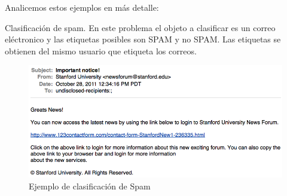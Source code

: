 \documentclass[11pt,fleqn]{book} %
\begin{document}
Analicemos estos ejemplos en más detalle:

\begin{example}
Clasificación de spam. En este problema el objeto a clasificar es un correo eléctronico y las etiquetas posibles son SPAM y no SPAM. Las etiquetas se obtienen del mismo usuario que etiqueta los correos.

\begin{figure}[h]
    \centering
    \includegraphics[scale = 0.35]{pics/spam.png}
    \caption{Ejemplo de clasificación de Spam}
    \label{fig:chomsky}
\end{figure}
 
 
\end{example}
\end{document}
